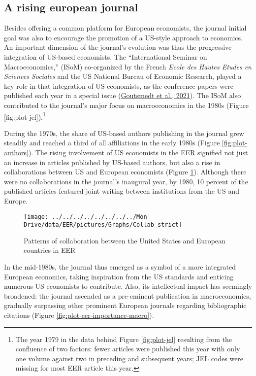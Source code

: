 \documentclass[
  12pt,
  onecolumn]{article}
\begin{document}
\hypertarget{rising-journal}{%
\subsection{A rising european journal}\label{rising-journal}}

Besides offering a common platform for European economists, the journal
initial goal was also to encourage the promotion of a US-style approach
to economics. An important dimension of the journal's evolution was thus
the progressive integration of US-based economists. The ``International
Seminar on Macroeconomics,'' (ISoM) co-organized by the French
\emph{Ecole des Hautes Etudes en Sciences Sociales} and the US National
Bureau of Economic Research, played a key role in that integration of US
economists, as the conference papers were published each year in a
special issue (\protect\hyperlink{ref-goutsmedt2021}{Goutsmedt et al.,
2021}). The ISoM also contributed to the journal's major focus on
macroeconomics in the 1980s (Figure \ref{fig:plot-jel}).\footnote{The
  year 1979 in the data behind Figure \ref{fig:plot-jel} resulting from
  the confluence of two factors: fewer articles were published this year
  with only one volume against two in preceding and subsequent years;
  JEL codes were missing for most EER article this year.}

During the 1970s, the share of US-based authors publishing in the
journal grew steadily and reached a third of all affiliations in the
early 1980s (Figure \ref{fig:plot-authors}). The rising involvement of
US economists in the EER signified not just an increase in articles
published by US-based authors, but also a rise in collaborations between
US and European economists (Figure \ref{fig:plot-collabs}). Although
there were no collaborations in the journal's inaugural year, by 1980,
10 percent of the published articles featured joint writing between
institutions from the US and Europe.

\begin{figure}[h]

{\centering \texttt{[image: ../../../../../../../../Mon Drive/data/EER/pictures/Graphs/Collab\_strict]} 

}

\caption{Patterns of collaboration between the United States and European countries in EER}\label{fig:plot-collabs}
\end{figure}

In the mid-1980s, the journal thus emerged as a symbol of a more
integrated European economics, taking inspiration from the US standards
and enticing numerous US economists to contribute. Also, its
intellectual impact has seemingly broadened: the journal ascended as a
pre-eminent publication in macroeconomics, gradually surpassing other
prominent European journals regarding bibliographic citations (Figure
\ref{fig:plot-eer-importance-macro}).
\end{document}

